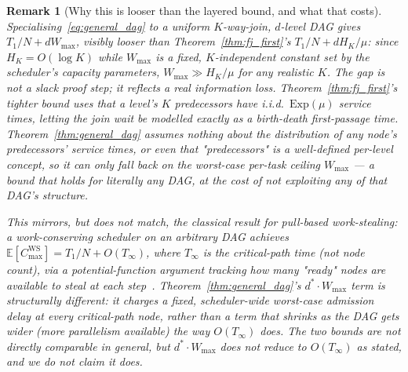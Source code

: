 \documentclass[11pt,a4paper]{report}
\newtheorem{remark}{Remark}[section]
\begin{document}
\begin{remark}[Why this is looser than the layered bound, and what that costs]
\label{rem:general_dag_loose}
Specialising~\eqref{eq:general_dag} to a uniform $K$-way-join, $d$-level
DAG gives $T_1/N + dW_{\max}$, visibly looser than
Theorem~\ref{thm:fj_first}'s $T_1/N + dH_K/\mu$: since $H_K = O(\log K)$
while $W_{\max}$ is a fixed, $K$-independent constant set by the
scheduler's capacity parameters, $W_{\max} \gg H_K/\mu$ for any
realistic $K$. The gap is not a slack proof step; it reflects a real
information loss. Theorem~\ref{thm:fj_first}'s tighter bound uses that
a level's $K$ predecessors have i.i.d.\ $\mathrm{Exp}(\mu)$ service
times, letting the join wait be modelled exactly as a birth-death
first-passage time. Theorem~\ref{thm:general_dag} assumes nothing about
the distribution of any node's predecessors' service times, or even
that "predecessors" is a well-defined per-level concept, so it can only
fall back on the worst-case per-task ceiling $W_{\max}$ --- a bound
that holds for literally any DAG, at the cost of not exploiting any of
that DAG's structure.

This mirrors, but does not match, the classical result for pull-based
work-stealing: a work-conserving scheduler on an arbitrary DAG achieves
$\mathbb{E}[C_{\max}^{\mathrm{WS}}] = T_1/N + O(T_\infty)$, where
$T_\infty$ is the critical-path \emph{time} (not node count), via a
potential-function argument tracking how many "ready" nodes are
available to steal at each
step~\cite{blumofe1999,arora2001}. Theorem~\ref{thm:general_dag}'s
$d^*\cdot W_{\max}$ term is structurally different: it charges a fixed,
scheduler-wide worst-case admission delay at \emph{every} critical-path
node, rather than a term that shrinks as the DAG gets wider (more
parallelism available) the way $O(T_\infty)$ does. The two bounds are
not directly comparable in general, but $d^* \cdot W_{\max}$ does not
reduce to $O(T_\infty)$ as stated, and we do not claim it does.
\end{remark}
\end{document}
